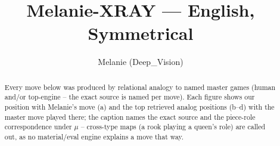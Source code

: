 \documentclass[11pt]{article}
\title{Melanie-XRAY — English, Symmetrical}
\author{Melanie (Deep\_Vision)}
\date{}
\begin{document}
\maketitle

\begin{abstract}Every move below was produced by relational analogy to named master games (human and/or top-engine -- the exact source is named per move). Each figure shows our position with Melanie's move (a) and the top retrieved analog positions (b--d) with the master move played there; the caption names the exact source and the piece-role correspondence under $\mu$ -- cross-type maps (a rook playing a queen's role) are called out, as no material/eval engine explains a move that way.\end{abstract}

\begin{figure}[p]\centering
\begin{subfigure}{0.46\textwidth}\centering
\resizebox{\linewidth}{!}{%
\newchessgame
\chessboard[
  setfen={r1bq1rk1/pp1pppbp/2n2np1/2p5/2P5/2N2NP1/PP1PPPBP/R1BQ1RK1 w - - 4 7},
  showmover=false,
  pgfstyle=straightmove, color=movearrow, markmove={h2-h4}
]}
\caption{}
\end{subfigure}\hfill
\begin{subfigure}{0.46\textwidth}\centering
\resizebox{\linewidth}{!}{%
\newchessgame
\chessboard[
  setfen={r1bqk2r/pp1pppbp/2n2np1/2p5/8/2NP1NP1/PPP1PPBP/R1BQ1RK1 b kq - 2 6},
  showmover=false,
  pgfstyle=straightmove, color=movearrow, markmove={d7-d5}
]}
\caption{}
\end{subfigure}
\\[4pt]
\begin{subfigure}{0.46\textwidth}\centering
\resizebox{\linewidth}{!}{%
\newchessgame
\chessboard[
  setfen={r1bqk2r/pp1pppbp/2n2np1/2p5/8/2NP1NP1/PPP1PPBP/R1BQ1RK1 b kq - 2 6},
  showmover=false,
  pgfstyle=straightmove, color=movearrow, markmove={d7-d5}
]}
\caption{}
\end{subfigure}\hfill
\begin{subfigure}{0.46\textwidth}\centering
\resizebox{\linewidth}{!}{%
\newchessgame
\chessboard[
  setfen={r1bqk2r/pp1pppbp/2n2np1/2p5/8/2NP1NP1/PPP1PPBP/R1BQ1RK1 b kq - 2 6},
  showmover=false,
  pgfstyle=straightmove, color=movearrow, markmove={d7-d5}
]}
\caption{}
\end{subfigure}

\end{figure}
\end{document}
